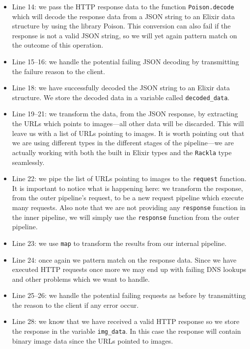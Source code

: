 \documentclass{cslthse-msc}
\begin{document}
\begin{itemize}
\item Line 14: we pass the HTTP response data to the function \lstinline{Poison.decode} which will decode the response data from a JSON string to an Elixir data structure by using the library Poison\cite{poison}. This conversion can also fail if the response is not a valid JSON string, so we will yet again pattern match on the outcome of this operation.

\item Line 15--16: we handle the potential failing JSON decoding by transmitting the failure reason to the client.

\item Line 18: we have successfully decoded the JSON string to an Elixir data structure. We store the decoded data in a variable called \lstinline{decoded_data}.

\item Line 19--21: we transform the data, from the JSON response, by extracting the URLs which points to images---all other data will be discarded. This will leave us with a list of URLs pointing to images. It is worth pointing out that we are using different types in the different stages of the pipeline---we are actually working with both the built in Elixir types and the \lstinline{Rackla} type seamlessly.

\item Line 22: we pipe the list of URLs pointing to images to the \lstinline{request} function. It is important to notice what is happening here: we transform the response, from the outer pipeline's request, to be a new request pipeline which execute many requests. Also note that we are not providing any \lstinline{response} function in the inner pipeline, we will simply use the \lstinline{response} function from the outer pipeline.

\item Line 23: we use \lstinline{map} to transform the results from our internal pipeline.

\item Line 24: once again we pattern match on the response data. Since we have executed HTTP requests once more we may end up with failing DNS lookups and other problems which we want to handle.

\item Line 25--26: we handle the potential failing requests as before by transmitting the reason to the client if any error occur.

\item Line 28: we know that we have received a valid HTTP response so we store the response in the variable \lstinline{img_data}. In this case the response will contain binary image data since the URLs pointed to images.


\end{itemize}
\end{document}
